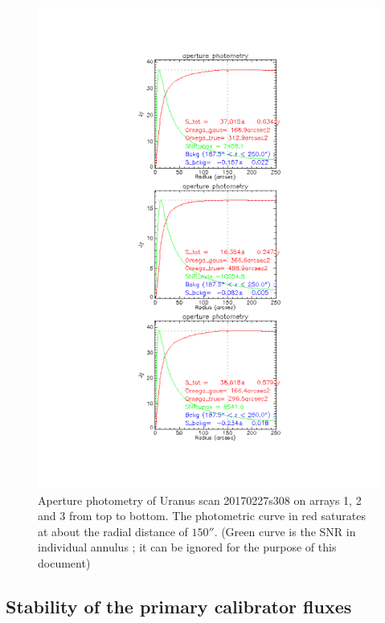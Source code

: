 \begin{figure}[p]
\begin{center}
  \includegraphics[clip, angle=0, scale=0.7]{Figures/Uranus_s308.pdf}
  \caption[Aperture photometry examples]{Aperture photometry of Uranus  scan 20170227s308  on arrays 1, 2 and 3 from top to bottom.
    The photometric curve in red saturates at about the radial
    distance of  $150''$. (Green curve is the SNR in individual
    annulus ; it can be ignored for the purpose of this document)}
\label{fig:PhAp}
\end{center}
\end{figure}


\subsection{Stability of the primary calibrator fluxes}
\label{ap:aperture_photometry_primary}


